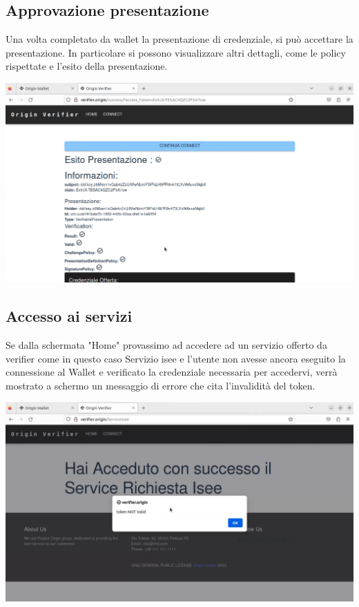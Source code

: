 \subsection{Approvazione presentazione}
Una volta completato da wallet la presentazione di credenziale, si può accettare la presentazione. In particolare si possono visualizzare altri dettagli, come le policy rispettate e l'esito della presentazione.
\begin{center}
    \includegraphics[scale = 0.2]{./res/img/verifier/new/verifier_after_presentation.png}
\end{center}
\subsection{Accesso ai servizi}
Se dalla schermata "Home" provassimo ad accedere ad un servizio offerto da verifier come in questo caso Servizio isee e l'utente non avesse ancora eseguito la connessione al Wallet e verificato la credenziale necessaria per accedervi, verrà mostrato a schermo un messaggio di errore che cita l'invalidità del token.

\begin{center}
    
    \includegraphics[scale = 0.2]{./res/img/verifier/new/verifier_token_not_valid.png}
\end{center}

